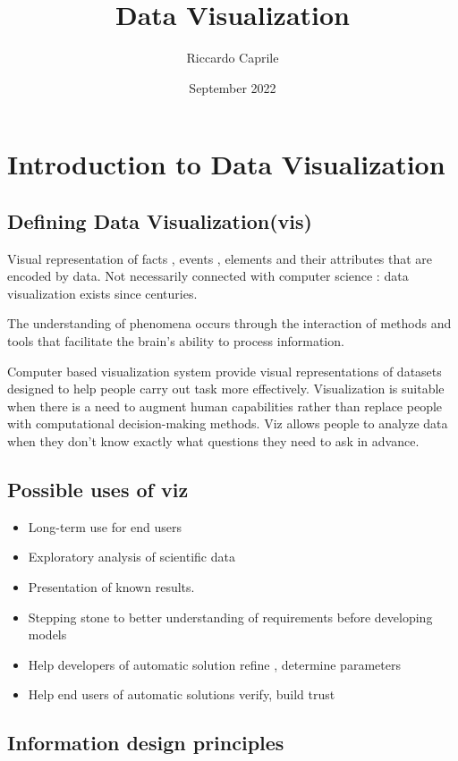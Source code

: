 \documentclass{article}
\title{Data Visualization}
\author{Riccardo Caprile}
\date{September 2022}
\begin{document}
\maketitle

\section{Introduction to Data Visualization}

\subsection{Defining Data Visualization(vis)}

Visual representation of facts , events , elements and their attributes that are encoded by data.
Not necessarily connected with computer science : data visualization exists since centuries.

The understanding of phenomena occurs through the interaction of methods and tools that facilitate the brain's ability to process information.

Computer based visualization system provide visual representations of datasets designed to help people carry out task more effectively.
Visualization is suitable when there is a need to augment human capabilities rather than replace people with computational decision-making methods.
Viz allows people to analyze data when they don't know exactly what questions they need to ask in advance.

\subsection{Possible uses of viz}
\begin{itemize}
    \item Long-term use for end users
    \item Exploratory analysis of scientific data
    \item Presentation of known results.
    \item Stepping stone to better understanding of requirements before developing models
    \item Help developers of automatic solution refine , determine parameters
    \item Help end users of automatic solutions verify, build trust
\end{itemize}

\vspace{15mm}

\subsection{Information design principles}
\end{document}
